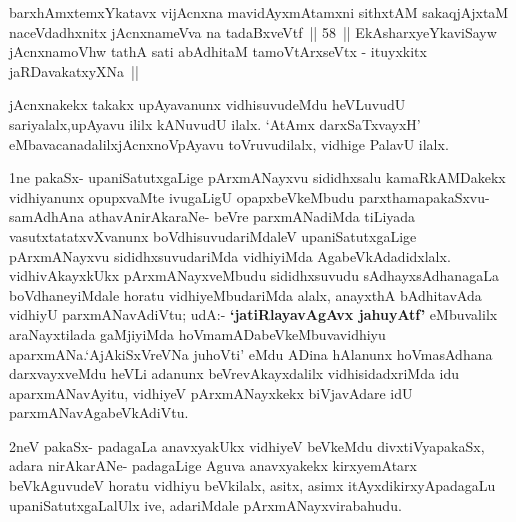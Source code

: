 \begin{shl}
barxhAmxtemxYkatavx vijAcnxna mavidAyxmAtamxni sithxtAM
sakaqjAjxtaM naceVdadhxnitx jAcnxnameVva na tadaBxveVtf~|| 58~||
EkAsharxyeYkaviSayw jAcnxnamoVhw tathA sati
abAdhitaM tamoV\s tArxseVtx - ituyxkitx jaRDavakatxyXNa~||
\end{shl}

\begin{artha}
jAcnxnakekx takakx upAyavanunx vidhisuvudeMdu heVLuvudU sariyalalx,\break upAyavu ililx kANuvudU ilalx. `AtAmx darxSaTxvayxH' eMbavacanadalilx\break jAcnxnoVpAyavu toVruvudilalx, vidhige PalavU ilalx.
\end{artha}

\centerline{}

\begin{artha}
1ne pakaSx- upaniSatutxgaLige pArxmANayxvu sididhxsalu kamaRkAMDakekx
vidhiyanunx opupxvaMte ivugaLigU opapxbeVkeMbudu parxthamapakaSxvu-
samAdhAna athavA\break nirAkaraNe- beVre parxmANadiMda
tiLiyada vasutxtatatxvXvanunx boVdhisuvudariMdaleV upaniSatutxgaLige
pArxmANayxvu sididhxsuvudariMda vidhiyiMda
AgabeVkAdadidxlalx. vidhivAkayxkUkx pArxmANayxveMbudu sididhxsuvudu
sAdhayxsAdhanagaLa boVdhaneyiMdale horatu vidhiyeMbudariMda alalx,
anayxthA bAdhitavAda vidhiyU parxmANavAdiVtu;  udA:- \textbf{`jatiRlayavAgAvx ja{\null}huyAtf'}
eMbuvalilx araNayxtilada gaMjiyiMda  hoVmamADabeVkeMbuvavidhiyu
aparxmANa.`AjAkiSxVreVNa juhoVti' eMdu ADina hAlanunx hoVmasAdhana darxvayxveMdu
heVLi adanunx beVrevAkayxdalilx vidhisidadxriMda idu aparxmANavAyitu,
vidhiyeV pArxmANayxkekx biVjavAdare idU parxmANavAgabeVkAdiVtu.
\end{artha}

\begin{artha}
2neV pakaSx- padagaLa anavxyakUkx vidhiyeV beVkeMdu divxtiVyapakaSx, adara nirAkarANe- padagaLige Aguva anavxyakekx kirxyemAtarx beVkAguvudeV horatu vidhiyu beVkilalx, asitx, asimx itAyxdikirxyApadagaLu upaniSatutxgaLalUlx ive, adariMdale pArxmANayxvirabahudu.
\end{artha}

